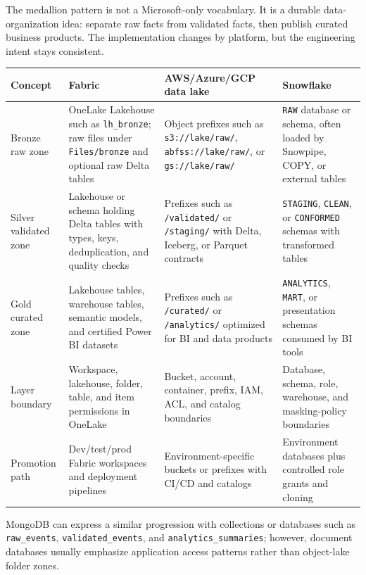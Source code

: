 \begin{crosscloud}
The medallion pattern is not a Microsoft-only vocabulary. It is a durable data-organization idea: separate raw facts from validated facts, then publish curated business products. The implementation changes by platform, but the engineering intent stays consistent.

\vspace{2mm}
{\footnotesize
\begin{tabular}{@{}p{3.0cm}p{3.4cm}p{4.2cm}p{3.6cm}@{}}
\toprule
\textbf{Concept} & \textbf{Fabric} & \textbf{AWS/Azure/GCP data lake} & \textbf{Snowflake} \\
\midrule
Bronze raw zone & OneLake Lakehouse such as \texttt{lh\_bronze}; raw files under \texttt{Files/bronze} and optional raw Delta tables & Object prefixes such as \texttt{s3://lake/raw/}, \texttt{abfss://lake/raw/}, or \texttt{gs://lake/raw/} & \texttt{RAW} database or schema, often loaded by Snowpipe, COPY, or external tables \\
Silver validated zone & Lakehouse or schema holding Delta tables with types, keys, deduplication, and quality checks & Prefixes such as \texttt{/validated/} or \texttt{/staging/} with Delta, Iceberg, or Parquet contracts & \texttt{STAGING}, \texttt{CLEAN}, or \texttt{CONFORMED} schemas with transformed tables \\
Gold curated zone & Lakehouse tables, warehouse tables, semantic models, and certified Power BI datasets & Prefixes such as \texttt{/curated/} or \texttt{/analytics/} optimized for BI and data products & \texttt{ANALYTICS}, \texttt{MART}, or presentation schemas consumed by BI tools \\
Layer boundary & Workspace, lakehouse, folder, table, and item permissions in OneLake & Bucket, account, container, prefix, IAM, ACL, and catalog boundaries & Database, schema, role, warehouse, and masking-policy boundaries \\
Promotion path & Dev/test/prod Fabric workspaces and deployment pipelines & Environment-specific buckets or prefixes with CI/CD and catalogs & Environment databases plus controlled role grants and cloning \\
\bottomrule
\end{tabular}}

\vspace{1mm}
MongoDB can express a similar progression with collections or databases such as \texttt{raw\_events}, \texttt{validated\_events}, and \texttt{analytics\_summaries}; however, document databases usually emphasize application access patterns rather than object-lake folder zones.
\end{crosscloud}

